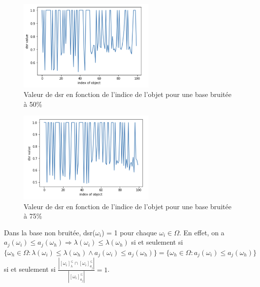 \documentclass[a4paper]{article}
\begin{document}
\begin{figure}[H]
	\center 
	\includegraphics[width=0.6\textwidth]{images/dsr_50.png}
    \caption{Valeur de dsr en fonction de l'indice de l'objet pour une base
    bruitée à 50\%}
    \label{img:dsr50}
\end{figure}

\begin{figure}[H]
	\center 
	\includegraphics[width=0.6\textwidth]{images/dsr_75.png}
    \caption{Valeur de dsr en fonction de l'indice de l'objet pour une base
    bruitée à 75\%}
    \label{img:dsr75}
\end{figure}


Dans la base non bruitée, dsr($\omega_i$) = 1 pour chaque $\omega_i \in \Omega$.
En effet, on a $a_j(\omega_i) \leq a_j(\omega_h) \Rightarrow \lambda(\omega_i)
\leq \lambda(\omega_h)$ si et seulement si $\{\omega_h \in \Omega :
\lambda(\omega_i) \leq \lambda(\omega_h) \land a_j(\omega_i) \leq
a_j(\omega_h)\} = \{\omega_h \in \Omega : a_j(\omega_i) \leq a_j(\omega_h)\}$ si
et seulement si $\frac{| [\omega_i]^{\leq}_{\lambda} \cap
[\omega_i]^{\leq}_{a_j}|}{| [\omega_i]^{\leq}_{a_j} |} = 1 $.
\end{document}

